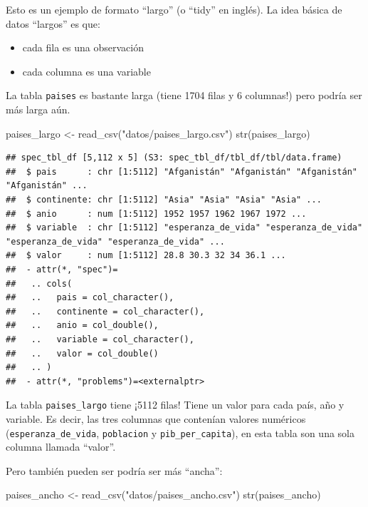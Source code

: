 \documentclass[
  openany]{book}
\newenvironment{Shaded}{\begin{snugshade}}{\end{snugshade}}
\newcommand{\FunctionTok}[1]{\textcolor[rgb]{0.00,0.00,0.00}{#1}}
\newcommand{\NormalTok}[1]{#1}
\newcommand{\OtherTok}[1]{\textcolor[rgb]{0.56,0.35,0.01}{#1}}
\newcommand{\StringTok}[1]{\textcolor[rgb]{0.31,0.60,0.02}{#1}}
\providecommand{\tightlist}{%
  \setlength{\itemsep}{0pt}\setlength{\parskip}{0pt}}
\begin{document}
Esto es un ejemplo de formato ``largo'' (o ``tidy'' en inglés).
La idea básica de datos ``largos'' es que:

\begin{itemize}
\tightlist
\item
  cada fila es una observación
\item
  cada columna es una variable
\end{itemize}

La tabla \texttt{paises} es bastante larga (tiene 1704 filas y 6 columnas!) pero podría ser más larga aún.

\begin{Shaded}
\begin{Highlighting}[]
\NormalTok{paises\_largo }\OtherTok{\textless{}{-}} \FunctionTok{read\_csv}\NormalTok{(}\StringTok{"datos/paises\_largo.csv"}\NormalTok{)}
\FunctionTok{str}\NormalTok{(paises\_largo)}
\end{Highlighting}
\end{Shaded}

\begin{verbatim}
## spec_tbl_df [5,112 x 5] (S3: spec_tbl_df/tbl_df/tbl/data.frame)
##  $ pais      : chr [1:5112] "Afganistán" "Afganistán" "Afganistán" "Afganistán" ...
##  $ continente: chr [1:5112] "Asia" "Asia" "Asia" "Asia" ...
##  $ anio      : num [1:5112] 1952 1957 1962 1967 1972 ...
##  $ variable  : chr [1:5112] "esperanza_de_vida" "esperanza_de_vida" "esperanza_de_vida" "esperanza_de_vida" ...
##  $ valor     : num [1:5112] 28.8 30.3 32 34 36.1 ...
##  - attr(*, "spec")=
##   .. cols(
##   ..   pais = col_character(),
##   ..   continente = col_character(),
##   ..   anio = col_double(),
##   ..   variable = col_character(),
##   ..   valor = col_double()
##   .. )
##  - attr(*, "problems")=<externalptr>
\end{verbatim}

La tabla \texttt{paises\_largo} tiene ¡5112 filas!
Tiene un valor para cada país, año y variable.
Es decir, las tres columnas que contenían valores numéricos (\texttt{esperanza\_de\_vida}, \texttt{poblacion} y \texttt{pib\_per\_capita}), en esta tabla son una sola columna llamada ``valor''.

Pero también pueden ser podría ser más ``ancha'':

\begin{Shaded}
\begin{Highlighting}[]
\NormalTok{paises\_ancho }\OtherTok{\textless{}{-}} \FunctionTok{read\_csv}\NormalTok{(}\StringTok{"datos/paises\_ancho.csv"}\NormalTok{)}
\FunctionTok{str}\NormalTok{(paises\_ancho)}
\end{Highlighting}
\end{Shaded}
\end{document}
